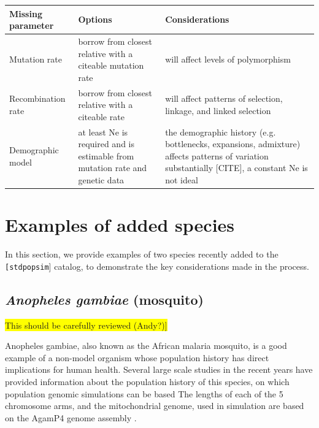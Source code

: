 \documentclass[hidelinks]{article}
\newcommand{\stdpopsim}{\texttt{stdpopsim}\xspace}
\begin{document}
\begin{table}[htb]
	\captionof{table}{Guide to missing parameters. \\
	\colorbox{yellow}{[TODO: reconsider table. Either clarify considerations or just defer to the text, which covers this quite clearly.}
	\colorbox{yellow}{Current version is too vague.}
} \label{tab:param-mod} 
	\begin{tabular}{p{1.5in}p{2.2in}p{2.2in}}
			\hline
			Missing parameter  & Options & Considerations \\
			\hline
			Mutation rate      & 
			borrow from closest relative with a citeable mutation rate & 
			will affect levels of polymorphism \\                                                                                          						\hline
			Recombination rate & 
			borrow from closest relative with a citeable rate &
			will affect patterns of selection, linkage, and linked selection
			\\
			\hline
			Demographic model & 
			at least Ne is required and is estimable from mutation rate and genetic data     & 
			the demographic history (e.g. bottlenecks, expansions, admixture) affects patterns of variation substantially {[}CITE{]}, a constant Ne is not ideal \\
			\hline
	\end{tabular}
\end{table}


\hypertarget{sec5}{%
	\section*{Examples of added species}\label{sec:examples}}

In this section, we provide examples of two species recently added to the \texttt[\stdpopsim] catalog,
to demonstrate the key considerations made in the process.

\hypertarget{ano-gambea}{%
	\subsection*{\texorpdfstring{\emph{Anopheles gambiae} (mosquito)}{Anopheles gambiae (mosquito)}}\label{AnoGam}}

\colorbox{yellow}{This should be carefully reviewed (Andy?)]}

Anopheles gambiae, also known as the African malaria mosquito, is a good example
of a non-model organism whose population history has direct implications for human health.
Several large scale studies in the recent years have provided information about the
population history of this species, on which population genomic simulations can be based \citep[e.g.,][]{Miles2017, clarkson2020genome}
The lengths of each of the 5 chromosome arms, and the mitochondrial genome, 
used in simulation are based on the AgamP4 genome assembly \citep{Sharakhova2007}. 
\end{document}
